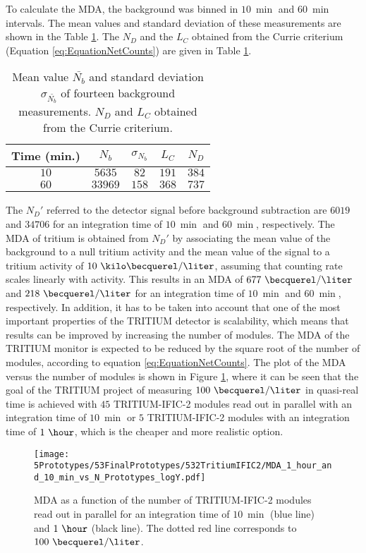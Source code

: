 To calculate the MDA, the background was binned in $10~\min$ and $60~\min$ intervals. The mean values and standard deviation of these measurements are shown in the Table \ref{tab:CurrieLawTRITIUMIFIC2}. The $N_D$ and the $L_C$ obtained from the Currie criterium (Equation \ref{eq:EquationNetCounts}) are given in Table \ref{tab:CurrieLawTRITIUMIFIC2}.
\begin{table}[htbp]
\centering{}%
\begin{tabular}{ccccc}
\toprule 
Time (min.) & $N_b$ & $\sigma_{N_b}$ & $L_C$ & $N_D$ \tabularnewline
\midrule
\midrule 
$10$ & $5635$ & $82$ & $191$ & $384$ \tabularnewline
$60$ & $33969$ & $158$ & $368$ & $737$ \tabularnewline
\bottomrule
\end{tabular}
\caption{Mean value $\bar{N_b}$ and standard deviation $\sigma_{\bar{N_b}}$ of fourteen background measurements. $N_D$ and $L_C$ obtained from the Currie criterium.}
\label{tab:CurrieLawTRITIUMIFIC2}
\end{table}
The $N_D'$ referred to the detector signal before background subtraction are $6019$ and $34706$ for an integration time of $10~\min$ and $60~\min$, respectively. The MDA of tritium is obtained from $N_D'$ by associating the mean value of the background to a null tritium activity and the mean value of the signal to a tritium activity of $10~\kilo\becquerel/\liter$, assuming that counting rate scales linearly with activity. This results in an MDA of $677~\becquerel/\liter$ and $218~\becquerel/\liter$ for an integration time of $10~\min$ and $60~\min$, respectively. In addition, it has to be taken into account that one of the most important properties of the TRITIUM detector is scalability, which means that results can be improved by increasing the number of modules. The MDA of the TRITIUM monitor is expected to be reduced by the square root of the number of modules, according to equation \ref{eq:EquationNetCounts}. The plot of the MDA versus the number of modules is shown in Figure \ref{fig:MDATRITIUMmonitor}, where it can be seen that the goal of the TRITIUM project of measuring $100~\becquerel/\liter$ in quasi-real time is achieved with $45$ TRITIUM-IFIC-2 modules read out in parallel with an integration time of $10~\min$ or $5$ TRITIUM-IFIC-2 modules with an integration time of $1~\hour$, which is the cheaper and more realistic option. %

\begin{figure}[h]
\centering
\texttt{[image: 5Prototypes/53FinalPrototypes/532TritiumIFIC2/MDA\_1\_hour\_and\_10\_min\_vs\_N\_Prototypes\_logY.pdf]}
\caption{MDA as a function of the number of TRITIUM-IFIC-2 modules read out in parallel for an integration time of $10~\min$ (blue line) and $1~\hour$ (black line). The dotted red line corresponds to $100~\becquerel/\liter$. \label{fig:MDATRITIUMmonitor}}
\end{figure}


